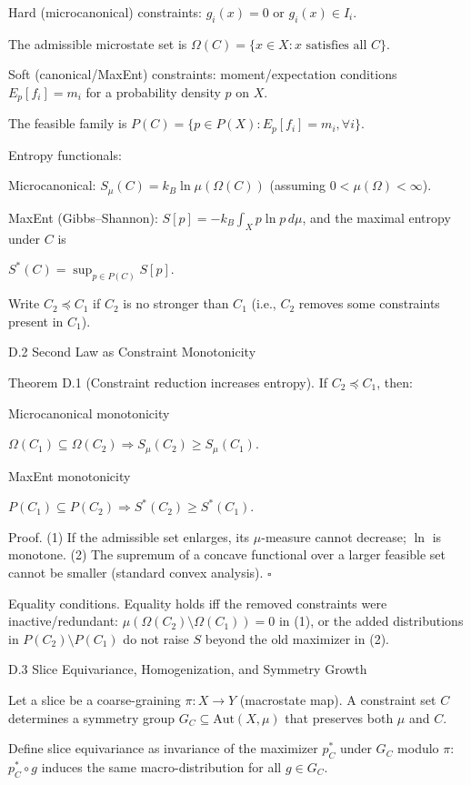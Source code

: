\documentclass[11pt,a4paper]{article}
\begin{document}
Hard (microcanonical) constraints: $g_i(x) = 0$ or $g_i(x) \in I_i$.

The admissible microstate set is $\Omega(C) = \{x \in X : x \text{ satisfies all } C\}$.

Soft (canonical/MaxEnt) constraints: moment/expectation conditions $E_p [f_i] = m_i$ for a probability density $p$ on $X$.

The feasible family is $P(C) = \{p \in P(X) : E_p [f_i] = m_i, \forall i\}$.

Entropy functionals:

Microcanonical: $S_\mu (C) = k_B \ln \mu(\Omega(C))$ (assuming $0 < \mu(\Omega) < \infty$).

MaxEnt (Gibbs–Shannon): $S[p] = -k_B \int_X p \ln p \, d\mu$, and the maximal entropy under $C$ is

$S^*(C) = \sup_{p \in P(C)} S[p]$.

Write $C_2 \preceq C_1$ if $C_2$ is no stronger than $C_1$ (i.e., $C_2$ removes some constraints present in $C_1$).

D.2 Second Law as Constraint Monotonicity

Theorem D.1 (Constraint reduction increases entropy).
If $C_2 \preceq C_1$, then:

Microcanonical monotonicity

$\Omega(C_1) \subseteq \Omega(C_2) \Rightarrow S_\mu (C_2) \geq S_\mu (C_1)$.

MaxEnt monotonicity

$P(C_1) \subseteq P(C_2) \Rightarrow S^*(C_2) \geq S^*(C_1)$.

Proof.
(1) If the admissible set enlarges, its $\mu$-measure cannot decrease; $\ln$ is monotone.
(2) The supremum of a concave functional over a larger feasible set cannot be smaller (standard convex analysis). $\square$

Equality conditions. Equality holds iff the removed constraints were inactive/redundant: $\mu(\Omega(C_2) \setminus \Omega(C_1)) = 0$ in (1), or the added distributions in $P(C_2) \setminus P(C_1)$ do not raise $S$ beyond the old maximizer in (2).

D.3 Slice Equivariance, Homogenization, and Symmetry Growth

Let a slice be a coarse-graining $\pi : X \to Y$ (macrostate map). A constraint set $C$ determines a symmetry group $G_C \subseteq \mathrm{Aut}(X, \mu)$ that preserves both $\mu$ and $C$.

Define slice equivariance as invariance of the maximizer $p_C^*$ under $G_C$ modulo $\pi$: $p_C^* \circ g$ induces the same macro-distribution for all $g \in G_C$.
\end{document}
